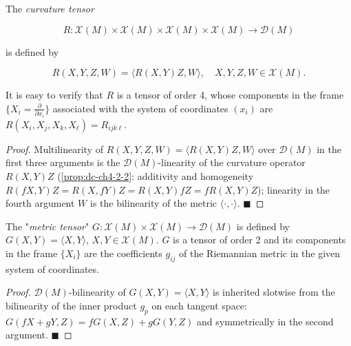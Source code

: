 \begin{example}
  \label{ex:dc-ch4-5-2}
  \leanok
  The \emph{curvature tensor}

  $$
  R:\mathcal{X}(M)\times\mathcal{X}(M)\times\mathcal{X}(M)\times\mathcal{X}(M)\to\mathcal{D}(M)
  $$

  is defined by

  $$
  R(X,Y,Z,W)=\langle R(X,Y)Z,W\rangle,\quad X,Y,Z,W\in\mathcal{X}(M).
  $$

  It is easy to verify that $R$ is a tensor of order 4, whose components in the
  frame $\{X_i=\frac{\partial}{\partial x_i}\}$ associated with the system of
  coordinates $(x_i)$ are $R(X_i,X_j,X_k,X_\ell)=R_{ijk\ell}$.
\end{example}
\begin{proof}
  \leanok
  Multilinearity of $R(X,Y,Z,W)=\langle R(X,Y)Z,W\rangle$ over $\mathcal{D}(M)$
  in the first three arguments is the $\mathcal{D}(M)$-linearity of the curvature
  operator $R(X,Y)Z$ (\cref{prop:dc-ch4-2-2}: additivity and homogeneity
  $R(fX,Y)Z=R(X,fY)Z=R(X,Y)fZ=fR(X,Y)Z$); linearity in the fourth argument $W$
  is the bilinearity of the metric $\langle\cdot,\cdot\rangle$. $\blacksquare$
\end{proof}

\begin{example}
  \label{ex:dc-ch4-5-3}
  \leanok
  The "\emph{metric tensor}" $G:\mathcal{X}(M)\times\mathcal{X}(M)\to\mathcal{D}(M)$ is
  defined by $G(X,Y)=\langle X,Y\rangle$, $X,Y\in\mathcal{X}(M)$. $G$ is a tensor of
  order 2 and its components in the frame $\{X_i\}$ are the coefficients $g_{ij}$ of
  the Riemannian metric in the given system of coordinates.
\end{example}
\begin{proof}
  \leanok
  $\mathcal{D}(M)$-bilinearity of $G(X,Y)=\langle X,Y\rangle$ is inherited slotwise
  from the bilinearity of the inner product $g_p$ on each tangent space:
  $G(fX+gY,Z)=fG(X,Z)+gG(Y,Z)$ and symmetrically in the second argument.
  $\blacksquare$
\end{proof}

